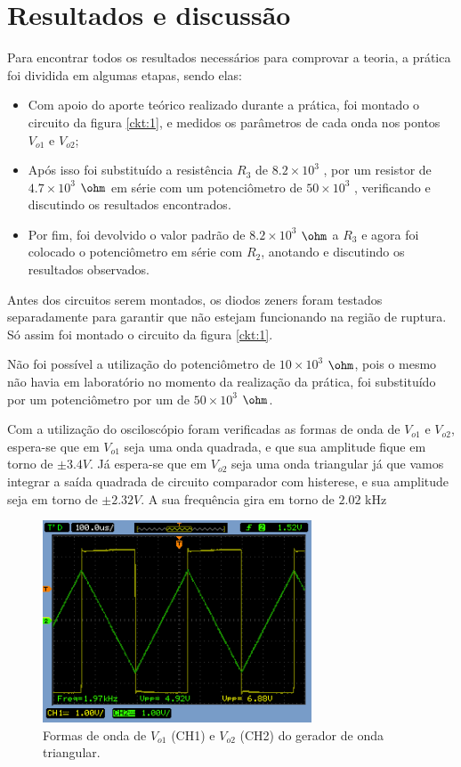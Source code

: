 \section{Resultados e discussão}

Para encontrar todos os resultados necessários para comprovar a teoria, a prática foi dividida em algumas etapas, sendo elas:


\begin{itemize}

    \item Com apoio do aporte teórico realizado durante a prática, foi montado o circuito da figura \ref{ckt:1}, e medidos os parâmetros de cada onda nos pontos $V_{o1}$ e $V_{o2}$;
    
    \item Após isso foi substituído a resistência $R_3$ de $8.2 \times10^3$ \ohm, por um resistor de $4.7 \times10^3$ $\ohm$ em série com um potenciômetro de $50 \times10^3 $ \ohm, verificando e discutindo os resultados encontrados.
    
    \item Por fim, foi devolvido o valor padrão de $8.2 \times10^3$ $\ohm$ a $R_3$ e agora foi colocado o potenciômetro em série com $R_2$, anotando e discutindo os resultados observados.  
\end{itemize}

Antes dos circuitos serem montados, os diodos zeners foram testados separadamente para garantir que não estejam funcionando na região de ruptura. Só assim foi montado o circuito da figura \ref{ckt:1}.

Não foi possível a utilização do potenciômetro de $10 \times10^3 $ $\ohm$, pois o mesmo não havia em laboratório no momento da realização da prática, foi substituído por um potenciômetro por um de $50 \times10^3 $ $\ohm$.   

Com a utilização do osciloscópio foram verificadas as formas de onda de $V_{o1}$ e $V_{o2}$, espera-se que em $V_{o1}$ seja uma onda quadrada, e que sua amplitude fique em torno de $\pm 3.4V$. Já espera-se que em $V_{o2}$ seja uma onda triangular já que vamos integrar a saída quadrada de circuito comparador com histerese, e sua amplitude seja em torno de $\pm 2.32V$. A sua frequência gira em torno de $2.02$ kHz

\begin{figure}[H] 
\centering
\includegraphics[width=8cm]{images/vo12.png}
\caption{Formas de onda de $V_{o1}$ (CH1) e $V_{o2}$ (CH2) do gerador de onda triangular.}
\label{fig1} 
\end{figure}


